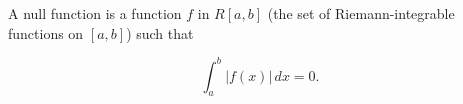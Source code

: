 A null function is a function $f$ in $R[a,b]$ (the set of Riemann-integrable functions on $[a,b]$) such that

$$\int_a^b |f(x)| \, dx = 0.$$
